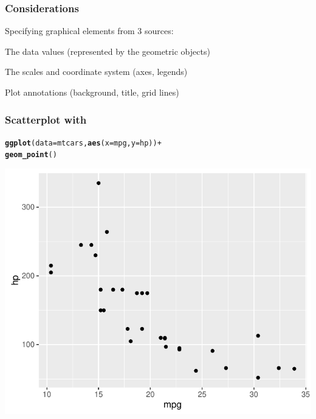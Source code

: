 \documentclass[12pt]{beamer}\usepackage[]{graphicx}\usepackage[]{color}
\makeatletter
\newcommand{\hlopt}[1]{\textcolor[rgb]{0,0,0}{#1}}%
\newcommand{\hlstd}[1]{\textcolor[rgb]{0.345,0.345,0.345}{#1}}%
\newcommand{\hlkwc}[1]{\textcolor[rgb]{0.333,0.667,0.333}{#1}}%
\newcommand{\hlkwd}[1]{\textcolor[rgb]{0.737,0.353,0.396}{\textbf{#1}}}%
\newenvironment{kframe}{%
 \def\at@end@of@kframe{}%
 \ifinner\ifhmode%
  \def\at@end@of@kframe{\end{minipage}}%
  \begin{minipage}{\columnwidth}%
 \fi\fi%
 \def\FrameCommand##1{\hskip\@totalleftmargin \hskip-\fboxsep
 \colorbox{shadecolor}{##1}\hskip-\fboxsep
     \hskip-\linewidth \hskip-\@totalleftmargin \hskip\columnwidth}%
 \MakeFramed {\advance\hsize-\width
   \@totalleftmargin\z@ \linewidth\hsize
   \@setminipage}}%
 {\par\unskip\endMakeFramed%
 \at@end@of@kframe}
\newenvironment{knitrout}{}{} %
\makeatother
\begin{document}

\begin{frame}[fragile]
\frametitle{Considerations}

Specifying graphical elements from 3 sources:
\bbi
  \item The data values (represented by the geometric objects)
  \item The scales and coordinate system (axes, legends)
  \item Plot annotations (background, title, grid lines)
\ei

\end{frame}


\begin{frame}[fragile]
\frametitle{Scatterplot with }
\begin{knitrout}\scriptsize
{}\color{fgcolor}\begin{kframe}
\begin{alltt}
\hlkwd{ggplot}\hlstd{(}\hlkwc{data} \hlstd{= mtcars,} \hlkwd{aes}\hlstd{(}\hlkwc{x} \hlstd{= mpg,} \hlkwc{y} \hlstd{= hp))} \hlopt{+}
  \hlkwd{geom_point}\hlstd{()}
\end{alltt}
\end{kframe}

{\centering \includegraphics[width=.7\linewidth,height=.6\linewidth]{figure/unnamed-chunk-13-1} 

}



\end{knitrout}
\end{frame}

\end{document}
